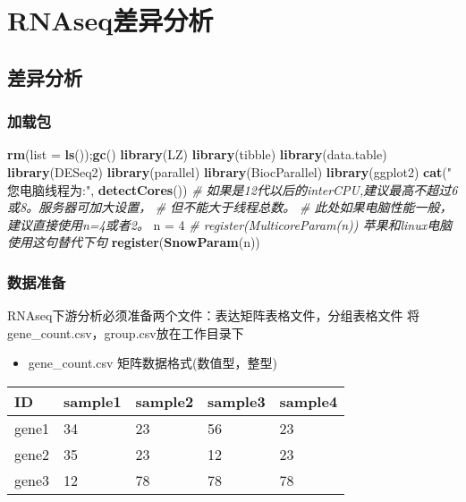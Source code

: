 \documentclass[
]{book}
\newenvironment{Shaded}{\begin{snugshade}}{\end{snugshade}}
\newcommand{\AttributeTok}[1]{\textcolor[rgb]{0.13,0.29,0.53}{#1}}
\newcommand{\CommentTok}[1]{\textcolor[rgb]{0.56,0.35,0.01}{\textit{#1}}}
\newcommand{\DecValTok}[1]{\textcolor[rgb]{0.00,0.00,0.81}{#1}}
\newcommand{\FunctionTok}[1]{\textcolor[rgb]{0.13,0.29,0.53}{\textbf{#1}}}
\newcommand{\NormalTok}[1]{#1}
\newcommand{\OtherTok}[1]{\textcolor[rgb]{0.56,0.35,0.01}{#1}}
\newcommand{\StringTok}[1]{\textcolor[rgb]{0.31,0.60,0.02}{#1}}
\providecommand{\tightlist}{%
  \setlength{\itemsep}{0pt}\setlength{\parskip}{0pt}}
\begin{document}
\chapter{RNAseq差异分析}\label{deg}

\section{差异分析}\label{deg-mian}

\subsection{加载包}\label{ux52a0ux8f7dux5305}

\begin{Shaded}
\begin{Highlighting}[]
\FunctionTok{rm}\NormalTok{(}\AttributeTok{list =} \FunctionTok{ls}\NormalTok{());}\FunctionTok{gc}\NormalTok{()}
\FunctionTok{library}\NormalTok{(LZ)}
\FunctionTok{library}\NormalTok{(tibble)}
\FunctionTok{library}\NormalTok{(data.table)}
\FunctionTok{library}\NormalTok{(DESeq2)}
\FunctionTok{library}\NormalTok{(parallel)}
\FunctionTok{library}\NormalTok{(BiocParallel)}
\FunctionTok{library}\NormalTok{(ggplot2)}
\FunctionTok{cat}\NormalTok{(}\StringTok{" 您电脑线程为:"}\NormalTok{, }\FunctionTok{detectCores}\NormalTok{())}
\CommentTok{\# 如果是12代以后的interCPU,建议最高不超过6或8。服务器可加大设置，}
\CommentTok{\#  但不能大于线程总数。}
\CommentTok{\# 此处如果电脑性能一般，建议直接使用n=4或者2。}
\NormalTok{n }\OtherTok{=} \DecValTok{4}
\CommentTok{\# register(MulticoreParam(n)) 苹果和linux电脑使用这句替代下句}
\FunctionTok{register}\NormalTok{(}\FunctionTok{SnowParam}\NormalTok{(n))}
\end{Highlighting}
\end{Shaded}

\subsection{数据准备}\label{ux6570ux636eux51c6ux5907}

RNAseq下游分析必须准备两个文件：表达矩阵表格文件，分组表格文件
将gene\_count.csv，group.csv放在工作目录下

\begin{itemize}
\tightlist
\item
  gene\_count.csv 矩阵数据格式(数值型，整型)
\end{itemize}

\begin{longtable}[]{@{}lllll@{}}
\toprule\noalign{}
ID & sample1 & sample2 & sample3 & sample4 \\
\midrule\noalign{}
\endhead
\bottomrule\noalign{}
\endlastfoot
gene1 & 34 & 23 & 56 & 23 \\
gene2 & 35 & 23 & 12 & 23 \\
gene3 & 12 & 78 & 78 & 78 \\
\end{longtable}
\end{document}
